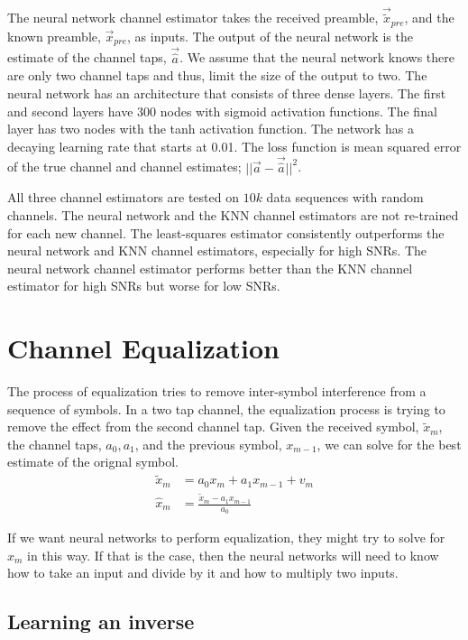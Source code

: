 The neural network channel estimator takes the received preamble, $\vec{\tilde{x}}_{pre}$, and the known preamble, $\vec{x}_{pre}$, as inputs.
The output of the neural network is the estimate of the channel taps, $\vec{\hat{a}}$.  We assume that the neural network knows there are only two channel taps and thus, limit the size of the output to two.
The neural network has an architecture that consists of three dense layers.  
The first and second layers have $300$ nodes with sigmoid activation functions.  The final layer has two nodes with the tanh activation function.  The network has a decaying learning rate that starts at 0.01. 
The loss function is mean squared error of the true channel and channel estimates; $||\vec{a}-\vec{\hat{a}}||^2$.

All three channel estimators are tested on $10k$ data sequences with random channels.  The neural network and the KNN channel estimators are not re-trained for each new channel.  The least-squares estimator consistently outperforms the neural network and KNN channel estimators, especially for high SNRs.
The neural network channel estimator performs better than the KNN channel estimator for high SNRs but worse for low SNRs.


\section{Channel Equalization}

The process of equalization tries to remove inter-symbol interference from a sequence of symbols.  
In a two tap channel, the equalization process is trying to remove the effect from the second channel tap.  Given the received symbol, $\tilde{x}_m$, the channel taps, $a_0, a_1$, and the previous symbol, $x_{m-1}$, we can solve for the best estimate of the orignal symbol.
\begin{align}
\tilde{x}_m &= a_0 x_{m} + a_1 x_{m-1} + v_m\\
\hat{x}_m &= \frac{\tilde{x}_m - a_1 x_{m-1}}{a_0}
\end{align}

If we want neural networks to perform equalization, they might try to solve for $\hat{x}_m$ in this way.  
If that is the case, then the neural networks will need to know how to take an input and divide by it and how to multiply two inputs.  

\subsection{Learning an inverse}


